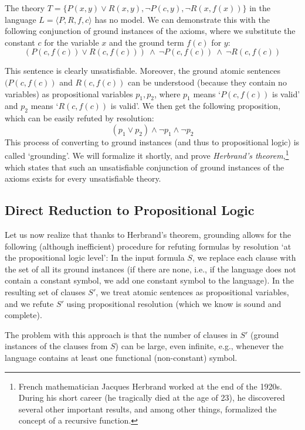 \begin{example}
    The theory $T=\{P(x,y)\lor R(x,y),\neg P(c,y),\neg R(x,f(x))\}$ in the language $L=\langle P,R,f,c \rangle$ has no model. We can demonstrate this with the following conjunction of ground instances of the axioms, where we substitute the constant $c$ for the variable $x$ and the ground term $f(c)$ for $y$:
$$
(P(c,f(c))\lor R(c,f(c)))\ \land\ \neg P(c,f(c))\ \land\ \neg R(c,f(c))
$$
\end{example}
This sentence is clearly unsatisfiable. Moreover, the ground atomic sentences $(P(c,f(c))$ and $R(c,f(c))$ can be understood (because they contain no variables) as propositional variables $p_1,p_2$, where $p_1$ means `$P(c,f(c))$ is valid' and $p_2$ means `$R(c,f(c))$ is valid'. We then get the following proposition, which can be easily refuted by resolution:
$$
(p_1 \lor p_2) \land \neg p_1 \land \neg p_2
$$
This process of converting to ground instances (and thus to propositional logic) is called `grounding'. We will formalize it shortly, and prove \emph{Herbrand's theorem},\footnote{French mathematician Jacques Herbrand worked at the end of the 1920s. During his short career (he tragically died at the age of 23), he discovered several other important results, and among other things, formalized the concept of a recursive function.} which states that such an unsatisfiable conjunction of ground instances of the axioms exists for every unsatisfiable theory.

\subsection{Direct Reduction to Propositional Logic}

Let us now realize that thanks to Herbrand's theorem, grounding allows for the following (although inefficient) procedure for refuting formulas by resolution `at the propositional logic level': In the input formula $S$, we replace each clause with the set of all its ground instances (if there are none, i.e., if the language does not contain a constant symbol, we add one constant symbol to the language). In the resulting set of clauses $S'$, we treat atomic sentences as propositional variables, and we refute $S'$ using propositional resolution (which we know is sound and complete).

The problem with this approach is that the number of clauses in $S'$ (ground instances of the clauses from $S$) can be large, even infinite, e.g., whenever the language contains at least one functional (non-constant) symbol.


